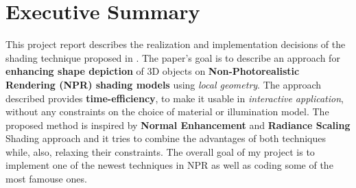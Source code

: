 \section*{Executive Summary}

This project report describes the realization and implementation decisions of the shading technique proposed in \cite{referencePaper}. \newline 
The paper's goal is to describe an approach for \textbf{enhancing shape depiction} of 3D objects on \textbf{Non-Photorealistic Rendering (NPR) shading models} using \textit{local geometry}. \newline
The approach described provides \textbf{time-efficiency}, to make it usable in \textit{interactive application}, without any constraints on the choice of material or illumination model. 
\newline The proposed method is inspired by \textbf{Normal Enhancement} and \textbf{Radiance Scaling} Shading approach and it tries to combine the advantages of both techniques while, also, relaxing their constraints. \newline
The overall goal of my project is to implement one of the newest techniques in NPR as well as coding some of the most famouse ones.